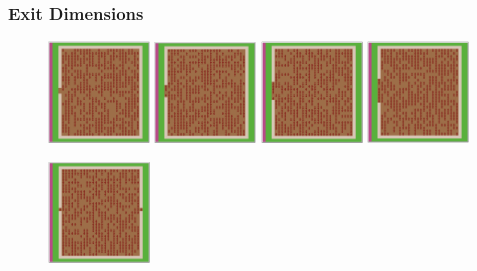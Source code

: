 \documentclass[12pt,letterpaper]{article}
\begin{document}
\subsubsection{Exit Dimensions}

\begin{figure}[ht]
  \centering
  \begin{minipage}[b]{.75\linewidth}
    \includegraphics[width=0.24\textwidth]{./figures/exit_dims_2_a.png}
    \includegraphics[width=0.24\textwidth]{./figures/exit_dims_4_a.png}
    \includegraphics[width=0.24\textwidth]{./figures/exit_dims_6_a.png}
    \includegraphics[width=0.24\textwidth]{./figures/exit_dims_8_a.png}
  \end{minipage}
  \begin{minipage}[b]{.75\linewidth}
    \includegraphics[width=0.24\textwidth]{./figures/exit_dims_2_b.png}

\end{minipage}
\end{figure}
\end{document}
